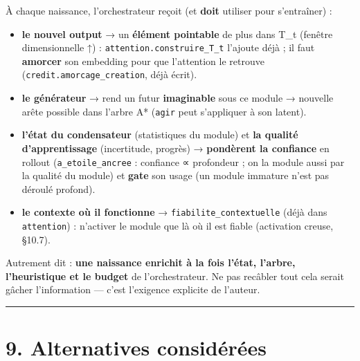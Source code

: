 \documentclass[
  french,
  11pt,
]{article}
\providecommand{\tightlist}{%
  \setlength{\itemsep}{0pt}\setlength{\parskip}{0pt}}
\begin{document}
À chaque naissance, l'orchestrateur reçoit (et \textbf{doit} utiliser
pour s'entraîner) :

\begin{itemize}
\tightlist
\item
  \textbf{le nouvel output} → un \textbf{élément pointable} de plus dans
  T\_t (fenêtre dimensionnelle ↑) : \texttt{attention.construire\_T\_t}
  l'ajoute déjà ; il faut \textbf{amorcer} son embedding pour que
  l'attention le retrouve (\texttt{credit.amorcage\_creation}, déjà
  écrit).
\item
  \textbf{le générateur} → rend un futur \textbf{imaginable} sous ce
  module → nouvelle arête possible dans l'arbre A* (\texttt{agir} peut
  s'appliquer à son latent).
\item
  \textbf{l'état du condensateur} (statistiques du module) et \textbf{la
  qualité d'apprentissage} (incertitude, progrès) → \textbf{pondèrent la
  confiance} en rollout (\texttt{a\_etoile\_ancree} : confiance ∝
  profondeur ; on la module aussi par la qualité du module) et
  \textbf{gate} son usage (un module immature n'est pas déroulé
  profond).
\item
  \textbf{le contexte où il fonctionne} →
  \texttt{fiabilite\_contextuelle} (déjà dans \texttt{attention}) :
  n'activer le module que là où il est fiable (activation creuse,
  §10.7).
\end{itemize}

Autrement dit : \textbf{une naissance enrichit à la fois l'état,
l'arbre, l'heuristique et le budget} de l'orchestrateur. Ne pas recâbler
tout cela serait gâcher l'information --- c'est l'exigence explicite de
l'auteur.

\begin{center}\rule{0.5\linewidth}{0.5pt}\end{center}

\section{9. Alternatives
considérées}\label{alternatives-considuxe9ruxe9es}
\end{document}
